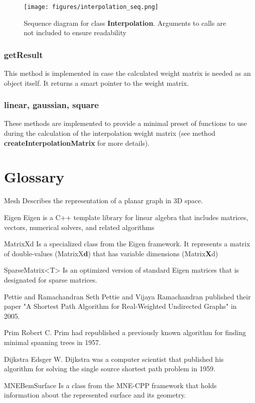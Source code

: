 \begin{figure}[h]
	\begin{center}
		\texttt{[image: figures/interpolation\_seq.png]}
		\caption{Sequence diagram for class \textbf{Interpolation}. Arguments to calls are not included to ensure readability}
	\end{center}
\end{figure}

\subsubsection{getResult}
This method is implemented in case the calculated weight matrix is needed as an object itself. It returns a smart pointer to the weight matrix.

\subsubsection{linear, gaussian, square}
These methods are implemented to provide a minimal preset of functions to use during the calculation of the interpolation weight matrix (see method \textbf{createInterpolationMatrix} for more details).

\clearpage

\section{Glossary}

\begin{aims}
	
	\item[Mesh] Describes the representation of a planar graph in 3D space.
	\item[Eigen] Eigen is a C++ template library for linear algebra that includes matrices, vectors, numerical solvers, and related algorithms
	\item[MatrixXd] Is a specialized class from the Eigen framework. It represents a matrix of double-values (MatrixX\textbf{d}) that has variable dimensions (Matrix\textbf{X}d)
	\item[SparseMatrix<T>] Is an optimized version of standard Eigen matrices that is designated for sparse matrices.
	\item[Pettie and Ramachandran] Seth Pettie and Vijaya Ramachandran published their paper "A Shortest Path Algorithm for Real-Weighted Undirected Graphs" in 2005.
	\item[Prim] Robert C. Prim had republished a previously known algorithm for finding minimal spanning trees in 1957.
	\item[Dijkstra] Edsger W. Dijkstra was a computer scientist that published his algorithm for solving the single source shortest path problem in 1959.
	\item[MNEBemSurface] Is a class from the MNE-CPP framework that holds information about the represented surface and its geometry.
	
\end{aims}

  

